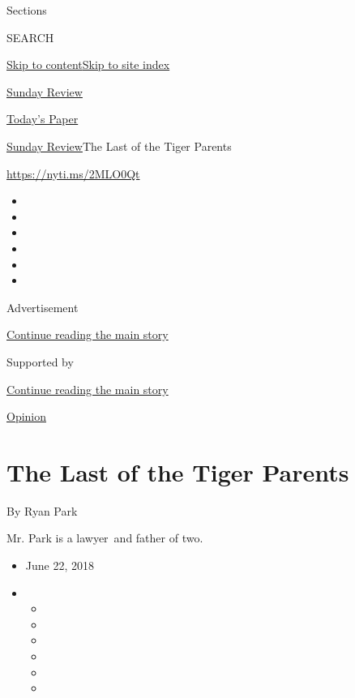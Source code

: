 Sections

SEARCH

\protect\hyperlink{site-content}{Skip to
content}\protect\hyperlink{site-index}{Skip to site index}

\href{https://www.nytimes3xbfgragh.onion/section/opinion/sunday}{Sunday
Review}

\href{https://myaccount.nytimes3xbfgragh.onion/auth/login?response_type=cookie\&client_id=vi}{}

\href{https://www.nytimes3xbfgragh.onion/section/todayspaper}{Today's
Paper}

\href{/section/opinion/sunday}{Sunday Review}\textbar{}The Last of the
Tiger Parents

\url{https://nyti.ms/2MLO0Qt}

\begin{itemize}
\item
\item
\item
\item
\item
\item
\end{itemize}

Advertisement

\protect\hyperlink{after-top}{Continue reading the main story}

Supported by

\protect\hyperlink{after-sponsor}{Continue reading the main story}

\href{/section/opinion}{Opinion}

\hypertarget{the-last-of-the-tiger-parents}{%
\section{The Last of the Tiger
Parents}\label{the-last-of-the-tiger-parents}}

By Ryan Park

Mr. Park is a lawyer~and father of two.

\begin{itemize}
\item
  June 22, 2018
\item
  \begin{itemize}
  \item
  \item
  \item
  \item
  \item
  \item
  \end{itemize}
\end{itemize}

